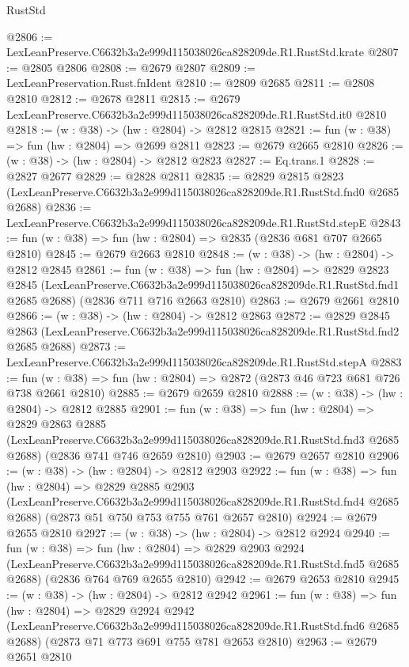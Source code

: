 \begin{lexlean}{RustStd}
\begin{coremodule}
@2806 := LexLeanPreserve.C6632b3a2e999d115038026ca828209de.R1.RustStd.krate
@2807 := @2805 @2806
@2808 := @2679 @2807
@2809 := LexLeanPreservation.Rust.fnIdent
@2810 := @2809 @2685
@2811 := @2808 @2810
@2812 := @2678 @2811
@2815 := @2679 LexLeanPreserve.C6632b3a2e999d115038026ca828209de.R1.RustStd.it0 @2810
@2818 := (w : @38) -> (hw : @2804) -> @2812 @2815
@2821 := fun (w : @38) => fun (hw : @2804) => @2699 @2811
@2823 := @2679 @2665 @2810
@2826 := (w : @38) -> (hw : @2804) -> @2812 @2823
@2827 := Eq.trans.{1}
@2828 := @2827 @2677
@2829 := @2828 @2811
@2835 := @2829
    @2815
    @2823
    (LexLeanPreserve.C6632b3a2e999d115038026ca828209de.R1.RustStd.fnd0 @2685 @2688)
@2836 := LexLeanPreserve.C6632b3a2e999d115038026ca828209de.R1.RustStd.stepE
@2843 := fun (w : @38) => fun (hw : @2804) => @2835 (@2836 @681 @707 @2665 @2810)
@2845 := @2679 @2663 @2810
@2848 := (w : @38) -> (hw : @2804) -> @2812 @2845
@2861 := fun (w : @38) =>
  fun (hw : @2804) =>
  @2829
    @2823
    @2845
    (LexLeanPreserve.C6632b3a2e999d115038026ca828209de.R1.RustStd.fnd1 @2685 @2688)
    (@2836 @711 @716 @2663 @2810)
@2863 := @2679 @2661 @2810
@2866 := (w : @38) -> (hw : @2804) -> @2812 @2863
@2872 := @2829
    @2845
    @2863
    (LexLeanPreserve.C6632b3a2e999d115038026ca828209de.R1.RustStd.fnd2 @2685 @2688)
@2873 := LexLeanPreserve.C6632b3a2e999d115038026ca828209de.R1.RustStd.stepA
@2883 := fun (w : @38) => fun (hw : @2804) => @2872 (@2873 @46 @723 @681 @726 @738 @2661 @2810)
@2885 := @2679 @2659 @2810
@2888 := (w : @38) -> (hw : @2804) -> @2812 @2885
@2901 := fun (w : @38) =>
  fun (hw : @2804) =>
  @2829
    @2863
    @2885
    (LexLeanPreserve.C6632b3a2e999d115038026ca828209de.R1.RustStd.fnd3 @2685 @2688)
    (@2836 @741 @746 @2659 @2810)
@2903 := @2679 @2657 @2810
@2906 := (w : @38) -> (hw : @2804) -> @2812 @2903
@2922 := fun (w : @38) =>
  fun (hw : @2804) =>
  @2829
    @2885
    @2903
    (LexLeanPreserve.C6632b3a2e999d115038026ca828209de.R1.RustStd.fnd4 @2685 @2688)
    (@2873 @51 @750 @753 @755 @761 @2657 @2810)
@2924 := @2679 @2655 @2810
@2927 := (w : @38) -> (hw : @2804) -> @2812 @2924
@2940 := fun (w : @38) =>
  fun (hw : @2804) =>
  @2829
    @2903
    @2924
    (LexLeanPreserve.C6632b3a2e999d115038026ca828209de.R1.RustStd.fnd5 @2685 @2688)
    (@2836 @764 @769 @2655 @2810)
@2942 := @2679 @2653 @2810
@2945 := (w : @38) -> (hw : @2804) -> @2812 @2942
@2961 := fun (w : @38) =>
  fun (hw : @2804) =>
  @2829
    @2924
    @2942
    (LexLeanPreserve.C6632b3a2e999d115038026ca828209de.R1.RustStd.fnd6 @2685 @2688)
    (@2873 @71 @773 @691 @755 @781 @2653 @2810)
@2963 := @2679 @2651 @2810

\end{coremodule}
\end{lexlean}
